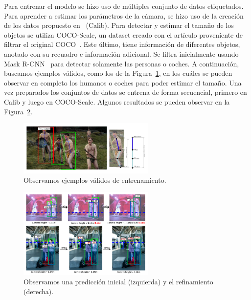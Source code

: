 \documentclass[12pt,letterpaper]{article}
\begin{document}
Para entrenar el modelo se hizo uso de múltiples conjunto de datos etiquetados. Para aprender a estimar los parámetros de la cámara, 
se hizo uso de la creación de los datos propuesto en~\cite{DeepSingleImageCalibration} (Calib). Para detectar y estimar el tamaño de los objetos se utiliza COCO-Scale, un dataset creado con el 
artículo proveniente de filtrar el original COCO~\cite{COCO}. Este último, tiene información de diferentes objetos, anotado con su recuadro e información adicional. 
Se filtra inicialmente usando Mask R-CNN~\cite{MaskRCNN} para detectar solamente las personas o coches. A continuación, buscamos ejemplos válidos, como los de la Figura~\ref{fig:Segmentacion}, en los cuáles 
se pueden observar en completo los humanos o coches para poder estimar el tamaño.
Una vez preparados los conjuntos de datos se entrena de forma secuencial, primero en Calib y luego en COCO-Scale. Algunos resultados 
se pueden observar en la Figura~\ref{fig:Resultados}.
\begin{figure}[!ht]
\begin{center}
    \includegraphics[width=0.6\textwidth]{Segmentacion}
\end{center}
\caption{Observamos ejemplos válidos de entrenamiento.}
\label{fig:Segmentacion}
\end{figure}

\begin{figure}[!ht]
\begin{center}
    \includegraphics[width=0.6\textwidth]{Resultados}
\end{center}
\caption{Observamos una predicción inicial (izquierda) y el refinamiento (derecha).}
\label{fig:Resultados}
\end{figure}

\printbibliography
\end{document}
